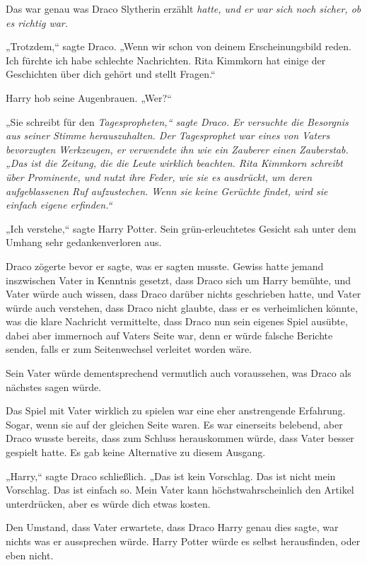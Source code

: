 {Das war genau was Draco Slytherin erzählt \emph{hatte, und er war sich noch sicher, ob es richtig war.}

„Trotzdem,“ sagte Draco. „Wenn wir schon von deinem Erscheinungsbild reden. Ich fürchte ich habe schlechte Nachrichten. Rita Kimmkorn hat einige der Geschichten über dich gehört und stellt Fragen.“

Harry hob seine Augenbrauen. „Wer?“

„Sie schreibt für den \emph{Tagespropheten,“ sagte Draco. Er versuchte die Besorgnis aus seiner Stimme herauszuhalten. Der \emph{Tagesprophet} war eines von Vaters bevorzugten Werkzeugen, er verwendete ihn wie ein Zauberer einen Zauberstab. „Das ist die Zeitung, die die Leute wirklich beachten. Rita Kimmkorn schreibt über Prominente, und nutzt ihre Feder, wie sie es ausdrückt, um deren aufgeblassenen Ruf aufzustechen. Wenn sie keine Gerüchte findet, wird sie einfach eigene \emph{erfinden}.“}

„Ich verstehe,“ sagte Harry Potter. Sein grün-erleuchtetes Gesicht sah unter dem Umhang sehr gedankenverloren aus.

Draco zögerte bevor er sagte, was er sagten musste. Gewiss hatte jemand inszwischen Vater in Kenntnis gesetzt, dass Draco sich um Harry bemühte, und Vater würde auch wissen, dass Draco darüber nichts geschrieben hatte, und Vater würde auch verstehen, dass Draco nicht glaubte, dass er es verheimlichen könnte, was die klare Nachricht vermittelte, dass Draco nun sein eigenes Spiel ausübte, dabei aber immernoch auf Vaters Seite war, denn er würde falsche Berichte senden, falls er zum Seitenwechsel verleitet worden wäre.

Sein Vater würde dementsprechend vermutlich auch voraussehen, was Draco als nächstes sagen würde.

Das Spiel mit Vater wirklich zu spielen war eine eher anstrengende Erfahrung. Sogar, wenn sie auf der gleichen Seite waren. Es war einerseits belebend, aber Draco wusste bereits, dass zum Schluss herauskommen würde, dass Vater besser gespielt hatte. Es gab keine Alternative zu diesem Ausgang.

„Harry,“ sagte Draco schließlich. „Das ist kein Vorschlag. Das ist nicht mein Vorschlag. Das ist einfach so. Mein Vater kann höchstwahrscheinlich den Artikel unterdrücken, aber es würde dich etwas kosten.

Den Umstand, dass Vater erwartete, dass Draco Harry genau dies sagte, war nichts was er aussprechen würde. Harry Potter würde es selbst herausfinden, oder eben nicht.

}
